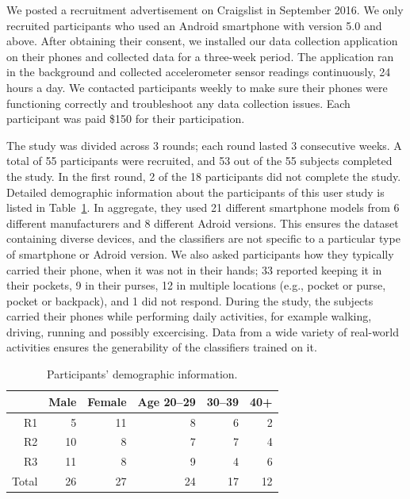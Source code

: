 We posted a recruitment advertisement on Craigslist in September 2016.
We only recruited participants who used an Android smartphone with version 5.0 and above.
After obtaining their consent, we installed our data collection application on their phones and collected data for a three-week period.
The application ran in the background and collected accelerometer sensor readings continuously, 24 hours a day.
We contacted participants weekly to make sure their phones were functioning correctly and troubleshoot any data collection issues.
Each participant was paid \$150 for their participation.

The study was divided across 3 rounds; each round lasted 3 consecutive weeks.
A total of 55 participants were recruited, and
53 out of the 55 subjects completed the study.
In the first round, 2 of the 18 participants did not complete the study.
Detailed demographic information about the participants of this user study is listed in Table~\ref{tbl:demographics}.
In aggregate, they used 21 different smartphone models from 6 different manufacturers and 8 different Adroid versions. This ensures the dataset containing diverse devices, and the classifiers are not specific to a particular type of smartphone or Adroid version.
We also asked participants how they typically carried their phone, when it was not in their hands; 33 reported keeping it in their pockets, 9 in their purses, 12 in multiple locations (e.g., pocket or purse, pocket or backpack), and 1 did not respond.
During the study, the subjects carried their phones while performing daily activities, for example walking, driving, running and possibly excercising. Data from a wide variety of real-world activities ensures the generability of the classifiers trained on it.

\begin{table}[H]
\centering
\caption{Participants' demographic information.}
\begin{tabular}{rrrrrr}
\hline
      & Male & Female & Age 20--29 & 30--39 & 40+ \\ \hline
R1    & 5    & 11     & 8         & 6     & 2   \\
R2    & 10   & 8      & 7         & 7     & 4   \\
R3    & 11   & 8      & 9         & 4     & 6   \\
Total & 26   & 27     & 24        & 17    & 12  \\ \hline
\end{tabular}
\label{tbl:demographics}
\end{table}




